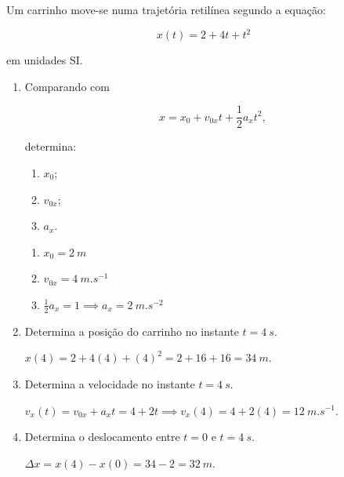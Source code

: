 \documentclass[11pt,a4paper]{article}
\begin{document}
	Um carrinho move-se numa trajetória retilínea segundo a equação:
	
	\[
	x(t)=2+4t+t^2
	\]
	
	em unidades SI.
	
	\begin{enumerate}[label=\textbf{\arabic*.},resume]
		
		\item Comparando com
		
		\[
		x=x_0+v_{0x}t+\frac{1}{2}a_xt^2,
		\]
		
		determina:
		
		\begin{enumerate}[label=\alph*)]
			
			\item $x_0$;
			
			\item $v_{0x}$;
			
			\item $a_x$.
			
		\end{enumerate}
		
		\begin{solucao}
			\begin{enumerate}[label=\alph*)]
				\item $x_0 = \SI{2}{m}$
				\item $v_{0x} = \SI{4}{m.s^{-1}}$
				\item $\frac{1}{2}a_x = 1 \implies a_x = \SI{2}{m.s^{-2}}$
			\end{enumerate}
		\end{solucao}
		
		\item Determina a posição do carrinho no instante $t=\SI{4}{s}$.
		
		\begin{solucao}
			$x(4) = 2 + 4(4) + (4)^2 = 2 + 16 + 16 = \SI{34}{m}$.
		\end{solucao}
		
		\item Determina a velocidade no instante $t=\SI{4}{s}$.
		
		\begin{solucao}
			$v_x(t) = v_{0x} + a_x t = 4 + 2t \implies v_x(4) = 4 + 2(4) = \SI{12}{m.s^{-1}}$.
		\end{solucao}
		
		\item Determina o deslocamento entre $t=0$ e $t=\SI{4}{s}$.
		
		\begin{solucao}
			$\Delta x = x(4) - x(0) = 34 - 2 = \SI{32}{m}$.
		\end{solucao}
		

\end{enumerate}
\end{document}
